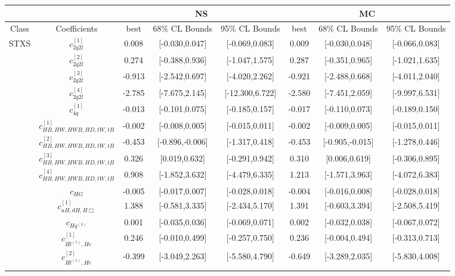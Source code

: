 \documentclass{article}
\begin{document}
\begin{table}[H]
\centering
\begin{tabular}{|c|c|c|c|c|c|c|c|}
\hline
 &  & \multicolumn{3}{c|}{NS}  & \multicolumn{3}{c|}{MC}  \\ \hline
Class & Coefficients & best & 68\% CL Bounds & 95\% CL Bounds & best & 68\% CL Bounds & 95\% CL Bounds\\ \hline
\multirow{24}{*}{STXS}
 & $c_{2q2l}^{[1]}$ & 0.008 & [-0.030,0.047] & [-0.069,0.083]  & 0.009 & [-0.030,0.048] & [-0.066,0.083]  \\ \cline{2-8}
 & $c_{2q2l}^{[2]}$ & 0.274 & [-0.388,0.936] & [-1.047,1.575]  & 0.287 & [-0.351,0.965] & [-1.021,1.635]  \\ \cline{2-8}
 & $c_{2q2l}^{[3]}$ & -0.913 & [-2.542,0.697] & [-4.020,2.262]  & -0.921 & [-2.488,0.668] & [-4.011,2.040]  \\ \cline{2-8}
 & $c_{2q2l}^{[4]}$ & -2.785 & [-7.675,2.145] & [-12.300,6.722]  & -2.580 & [-7.451,2.059] & [-9.997,6.531]  \\ \cline{2-8}
 & $c_{4q}^{[1]}$ & -0.013 & [-0.101,0.075] & [-0.185,0.157]  & -0.017 & [-0.110,0.073] & [-0.189,0.150]  \\ \cline{2-8}
 & $c_{HB,HW,HWB,HD,tW,tB}^{[1]}$ & -0.002 & [-0.008,0.005] & [-0.015,0.011]  & -0.002 & [-0.009,0.005] & [-0.015,0.011]  \\ \cline{2-8}
 & $c_{HB,HW,HWB,HD,tW,tB}^{[2]}$ & -0.453 & [-0.896,-0.006] & [-1.317,0.418]  & -0.453 & [-0.905,-0.015] & [-1.278,0.446]  \\ \cline{2-8}
 & $c_{HB,HW,HWB,HD,tW,tB}^{[3]}$ & 0.326 & [0.019,0.632] & [-0.291,0.942]  & 0.310 & [0.006,0.619] & [-0.306,0.895]  \\ \cline{2-8}
 & $c_{HB,HW,HWB,HD,tW,tB}^{[4]}$ & 0.908 & [-1.852,3.632] & [-4.479,6.335]  & 1.213 & [-1.571,3.963] & [-4.072,6.383]  \\ \cline{2-8}
 & $c_{HG}$ & -0.005 & [-0.017,0.007] & [-0.028,0.018]  & -0.004 & [-0.016,0.008] & [-0.028,0.018]  \\ \cline{2-8}
 & $c_{uH,dH,H\Box}^{[1]}$ & 1.388 & [-0.581,3.335] & [-2.434,5.170]  & 1.391 & [-0.603,3.394] & [-2.508,5.419]  \\ \cline{2-8}
 & $c_{Hq^(3)}$ & 0.001 & [-0.035,0.036] & [-0.069,0.071]  & 0.002 & [-0.032,0.038] & [-0.067,0.072]  \\ \cline{2-8}
 & $c_{Hl^{(1)},He}^{[1]}$ & 0.246 & [-0.010,0.499] & [-0.257,0.750]  & 0.236 & [-0.004,0.494] & [-0.313,0.713]  \\ \cline{2-8}
 & $c_{Hl^{(1)},He}^{[2]}$ & -0.399 & [-3.049,2.263] & [-5.580,4.790]  & -0.649 & [-3.289,2.035] & [-5.830,4.008]  \\ \cline{2-8}

\end{tabular}
\end{table}
\end{document}
